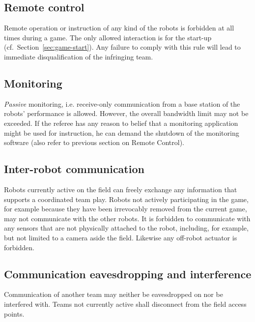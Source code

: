 \documentclass[12pt,twoside]{article}
\newcommand{\refsec}[1]{Section~\ref{#1}}
\begin{document}
\subsection{Remote control}
\label{sec:remote-control}
Remote operation or instruction of any kind of the robots is forbidden
at all times during a game. The only allowed interaction is for the start-up
(cf.~\refsec{sec:game-start}). Any failure to comply with this rule will lead to
immediate disqualification of the infringing team.

\subsection{Monitoring}
\label{sec:monitoring}
\emph{Passive} monitoring, i.e. receive-only communication from a base
station of the robots' performance is allowed. However, the overall
bandwidth limit may not be exceeded.
If the referee has any reason to belief that a monitoring application
might be used for instruction, he can demand the shutdown of the
monitoring software (also refer to previous section on Remote
Control).

\subsection{Inter-robot communication}
\label{sec:inter-robot-comm}
Robots currently active on the field can freely exchange any
information that supports a coordinated team play. Robots not actively
participating in the game, for example because they have been
irrevocably removed from the current game, may not communicate with
the other robots. It is forbidden to communicate with any sensors that
are not physically attached to the robot, including, for example, but
not limited to a camera aside the field. Likewise any off-robot
actuator is forbidden.

\subsection{Communication eavesdropping and interference}
\label{sec:comm-tampering}
Communication of another team may neither be eavesdropped on nor be
interfered with. Teams not currently active shall disconnect from the
field access points.
\end{document}
